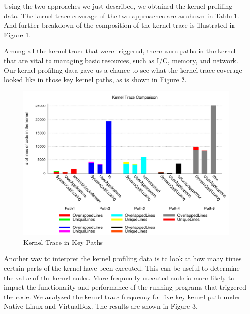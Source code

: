 Using the two approaches we just described, we obtained the kernel profiling data.
The kernel trace coverage of the two approaches are as shown in Table 1. 
And further breakdown of the composition of the kernel trace is illustrated in Figure 1.

Among all the kernel trace that were triggered, there were paths in the kernel that 
are vital to managing basic resources, such as I/O, memory, and network. Our kernel profiling data
gave us a chance to see what the kernel trace coverage looked like in those key kernel paths, 
as is shown in Figure 2.

\begin{figure}[h]
\centering
\includegraphics[width=1.0\columnwidth]{diagram/lind_ccs15_diagram_02.pdf}
\caption{Kernel Trace in Key Paths}
\label{fig:key_paths_trace}
\end{figure}

Another way to interpret the kernel profiling data is to look at how many times certain parts of the kernel
have been executed. This can be useful to determine the value of the kernel codes. More frequently executed
code is more likely to impact the functionality and performance of the running programs that triggered the code.
We analyzed the kernel trace frequency for five key kernel path under Native Linux and VirtualBox. The results are 
shown in Figure 3.

